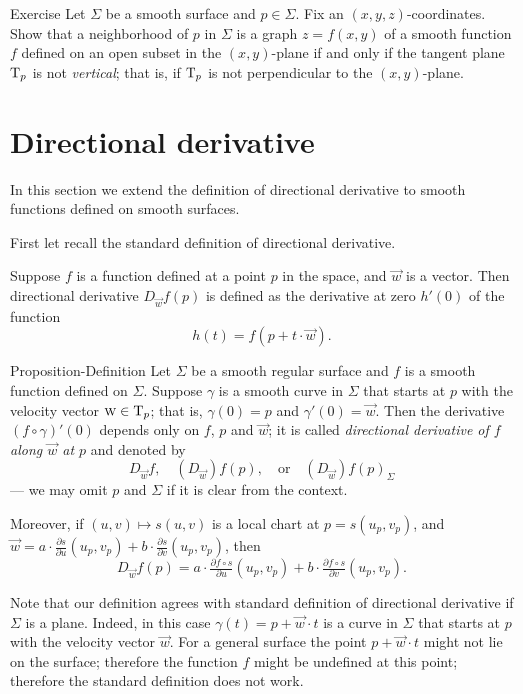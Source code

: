 \begin{thm}{Exercise}\label{ex:vertical-tangent}
Let $\Sigma$ be a smooth surface and $p\in\Sigma$.
Fix an $(x,y,z)$-coordinates.
Show that a neighborhood of $p$ in $\Sigma$ is a graph $z=f(x,y)$ of a smooth function $f$ defined on an open subset in the $(x,y)$-plane if and only if the tangent plane $\mathrm{T}_p$ is not \emph{vertical}; that is, if $\mathrm{T}_p$ is not perpendicular to the $(x,y)$-plane.
\end{thm}


\section*{Directional derivative}

In this section we extend the definition of directional derivative to smooth functions defined on smooth surfaces.

First let recall the standard definition of directional derivative.

Suppose $f$ is a function defined at a point $p$ in the space, and $\vec w$ is a vector.
Then directional derivative $D_{\vec w}f(p)$ is defined as the derivative at zero $h'(0)$ of the function
\[h(t)=f(p+t\cdot\vec w).\]

\begin{thm}{Proposition-Definition}\label{def:directional-derivative}
Let $\Sigma$ be a smooth regular surface and $f$ is a smooth function defined on $\Sigma$. 
Suppose $\gamma$ is a smooth curve in $\Sigma$ that starts at $p$ with the velocity vector $\textsc{w}\in \mathrm{T}_p$;
that is, $\gamma(0)=p$ and $\gamma'(0)=\vec{w}$.
Then the derivative $(f\circ\gamma)'(0)$
depends only on $f$, $p$ and $\vec{w}$;
it is called \emph{directional derivative of $f$ along $\vec{w}$ at $p$}
and denoted by
\[D_{\vec{w}}f,\quad(D_{\vec{w}})f(p), \quad\text{or}\quad (D_{\vec{w}})f(p)_\Sigma\] 
--- we may omit $p$ and $\Sigma$ if it is clear from the context.

Moreover, if $(u,v)\mapsto s(u,v)$ is a local chart at $p=s(u_p,v_p)$, and $\vec{w}=a\cdot \tfrac{\partial s}{\partial u}(u_p,v_p)+b\cdot \tfrac{\partial s}{\partial v}(u_p,v_p)$, then 
\[D_{\vec{w}}f(p)=a\cdot\tfrac{\partial f\circ s}{\partial u}(u_p,v_p)+b\cdot \tfrac{\partial f\circ s}{\partial v}(u_p,v_p).\]

\end{thm}

Note that our definition agrees with standard definition of directional derivative if $\Sigma$ is a plane.
Indeed, in this case $\gamma(t)=p+\vec w\cdot t$ is a curve in $\Sigma$ that starts at $p$ with the velocity vector $\vec{w}$.
For a general surface the point $p+\vec w\cdot t$ might not lie on the surface; therefore the function $f$ might be undefined at this point; therefore the standard definition does not work.

